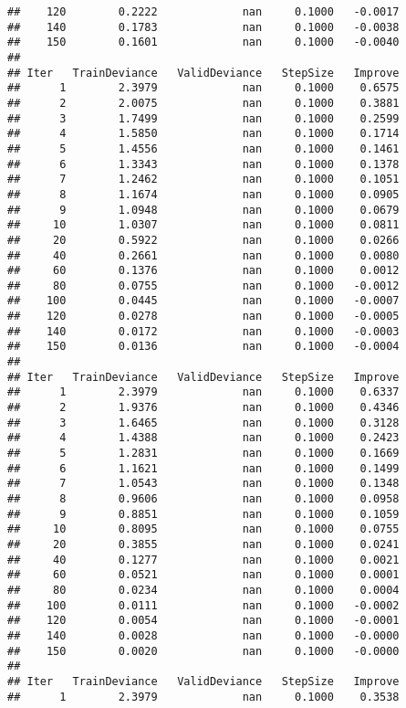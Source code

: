 \documentclass[]{article}
\begin{document}
\begin{verbatim}
##    120        0.2222             nan     0.1000   -0.0017
##    140        0.1783             nan     0.1000   -0.0038
##    150        0.1601             nan     0.1000   -0.0040
## 
## Iter   TrainDeviance   ValidDeviance   StepSize   Improve
##      1        2.3979             nan     0.1000    0.6575
##      2        2.0075             nan     0.1000    0.3881
##      3        1.7499             nan     0.1000    0.2599
##      4        1.5850             nan     0.1000    0.1714
##      5        1.4556             nan     0.1000    0.1461
##      6        1.3343             nan     0.1000    0.1378
##      7        1.2462             nan     0.1000    0.1051
##      8        1.1674             nan     0.1000    0.0905
##      9        1.0948             nan     0.1000    0.0679
##     10        1.0307             nan     0.1000    0.0811
##     20        0.5922             nan     0.1000    0.0266
##     40        0.2661             nan     0.1000    0.0080
##     60        0.1376             nan     0.1000    0.0012
##     80        0.0755             nan     0.1000   -0.0012
##    100        0.0445             nan     0.1000   -0.0007
##    120        0.0278             nan     0.1000   -0.0005
##    140        0.0172             nan     0.1000   -0.0003
##    150        0.0136             nan     0.1000   -0.0004
## 
## Iter   TrainDeviance   ValidDeviance   StepSize   Improve
##      1        2.3979             nan     0.1000    0.6337
##      2        1.9376             nan     0.1000    0.4346
##      3        1.6465             nan     0.1000    0.3128
##      4        1.4388             nan     0.1000    0.2423
##      5        1.2831             nan     0.1000    0.1669
##      6        1.1621             nan     0.1000    0.1499
##      7        1.0543             nan     0.1000    0.1348
##      8        0.9606             nan     0.1000    0.0958
##      9        0.8851             nan     0.1000    0.1059
##     10        0.8095             nan     0.1000    0.0755
##     20        0.3855             nan     0.1000    0.0241
##     40        0.1277             nan     0.1000    0.0021
##     60        0.0521             nan     0.1000    0.0001
##     80        0.0234             nan     0.1000    0.0004
##    100        0.0111             nan     0.1000   -0.0002
##    120        0.0054             nan     0.1000   -0.0001
##    140        0.0028             nan     0.1000   -0.0000
##    150        0.0020             nan     0.1000   -0.0000
## 
## Iter   TrainDeviance   ValidDeviance   StepSize   Improve
##      1        2.3979             nan     0.1000    0.3538

\end{verbatim}
\end{document}
